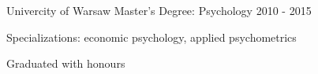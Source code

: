 \begin{cventries}
  \cventry
    {Univercity of Warsaw}
    {Master’s Degree: Psychology}
    {}
    {2010 - 2015}
    {
      \begin{cvitems}
        \item {Specializations: economic psychology, applied psychometrics}
        \item {Graduated with honours}
      \end{cvitems}
    }
\end{cventries}
